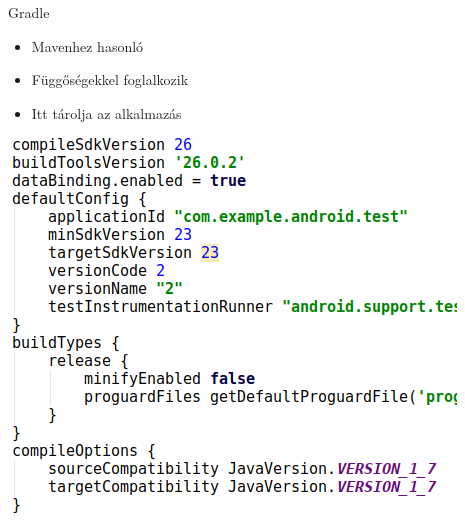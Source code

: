 \documentclass{beamer}
\begin{document}
\begin{frame}[fragile]{Gradle}
	\begin{minipage}{0.49\textwidth}
		\begin{itemize}
			\item Mavenhez hasonló 
			\item Függőségekkel foglalkozik
			\item Itt tárolja az alkalmazás 
		\end{itemize}
	\end{minipage}
\begin{minipage}{0.49\textwidth}
	\begin{itemize}
		\includegraphics[width=1\linewidth]{figures/gradle.png}
	\end{itemize}
\end{minipage}
\end{frame}
\end{document}
